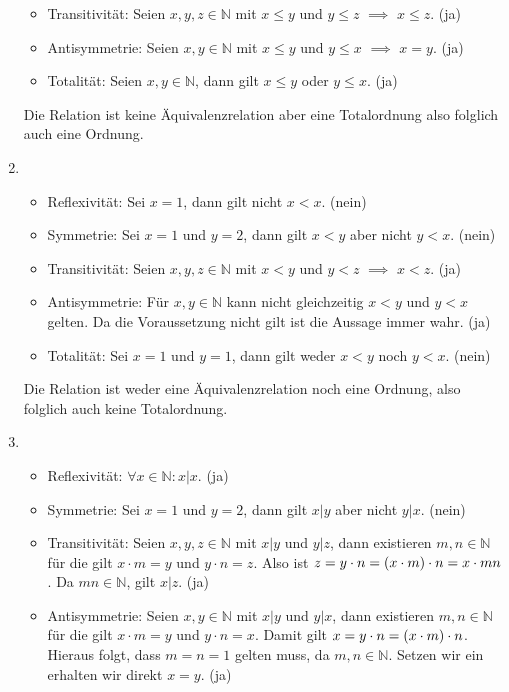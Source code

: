 \documentclass[german,12pt]{homework}
\newcommand{\NN}{\mathbb{N}}
\DeclarePairedDelimiter{\enbrace}{(}{)}
\begin{document}
\begin{enumerate}
\begin{itemize}
    		\item Transitivität: Seien \(x, y, z \in \NN\) mit \(x \le y\) und \(y \le z\) \(\implies\) \(x \le z\). (ja)
    		\item Antisymmetrie: Seien \(x, y \in \NN\) mit \(x \le y\) und \(y \le x\) \(\implies\) \(x = y\). (ja)
    		\item Totalität: Seien \(x, y \in \NN\), dann gilt \(x \le y\) oder \(y \le x\). (ja)
    	\end{itemize}
    	Die Relation ist keine Äquivalenzrelation aber eine Totalordnung also folglich auch eine Ordnung.
        \item\ \\
        \begin{itemize}
    		\item Reflexivität: Sei \(x = 1\), dann gilt nicht \(x < x\). (nein)
    		\item Symmetrie: Sei \(x = 1\) und \(y = 2\), dann gilt \(x < y\) aber nicht \(y < x\). (nein)
    		\item Transitivität: Seien \(x, y, z \in \NN\) mit \(x < y\) und \(y < z\) \(\implies\) \(x < z\). (ja)
    		\item Antisymmetrie: Für \(x, y \in \NN\) kann nicht gleichzeitig \(x < y\) und \(y < x\) gelten. Da die Voraussetzung nicht gilt ist die Aussage immer wahr. (ja)
    		\item Totalität: Sei \(x = 1\) und \(y = 1\), dann gilt weder \(x < y\) noch \(y < x\). (nein)
    	\end{itemize}
    	Die Relation ist weder eine Äquivalenzrelation noch eine Ordnung, also folglich auch keine Totalordnung.
        \item\ \\
        \begin{itemize}
    		\item Reflexivität: \({\forall}x \in \NN: x | x\). (ja)
    		\item Symmetrie: Sei \(x = 1\) und \(y = 2\), dann gilt \(x | y\) aber nicht \(y | x\). (nein)
    		\item Transitivität: Seien \(x, y, z \in \NN\) mit \(x | y\) und \(y | z\), dann existieren \(m, n \in \NN\) für die gilt \(x \cdot m = y\) und \(y \cdot n = z\). Also ist \(z = y \cdot n = \enbrace*{x \cdot m} \cdot n = x \cdot mn\). Da \(mn \in \NN\), gilt \(x | z\). (ja)
    		\item Antisymmetrie: Seien \(x, y \in \NN\) mit \(x | y\) und \(y | x\), dann existieren \(m, n \in \NN\) für die gilt \(x \cdot m = y\) und \(y \cdot n = x\). Damit gilt \(x = y \cdot n = \enbrace*{x \cdot m} \cdot n\). Hieraus folgt, dass \(m = n = 1\) gelten muss, da \(m, n \in \NN\). Setzen wir ein erhalten wir direkt \(x = y\). (ja)

\end{itemize}
\end{enumerate}
\end{document}
